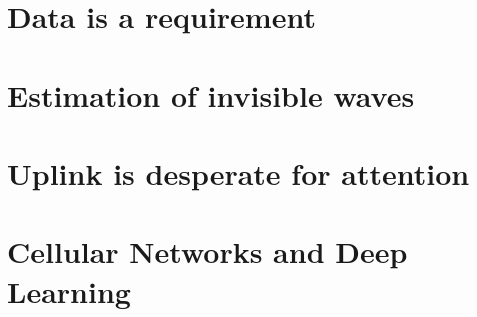 \documentclass[nobib, b5paper]{tufte-book}
\begin{document}
\epigraphhead[350]{}
\part{Data is a requirement}



\part{Estimation of invisible waves}





\part{Uplink is desperate for attention}




\part{Cellular Networks and Deep Learning}







\appendix












\backmatter



%
{\footnotesize
\printbibliography}


\end{document}
